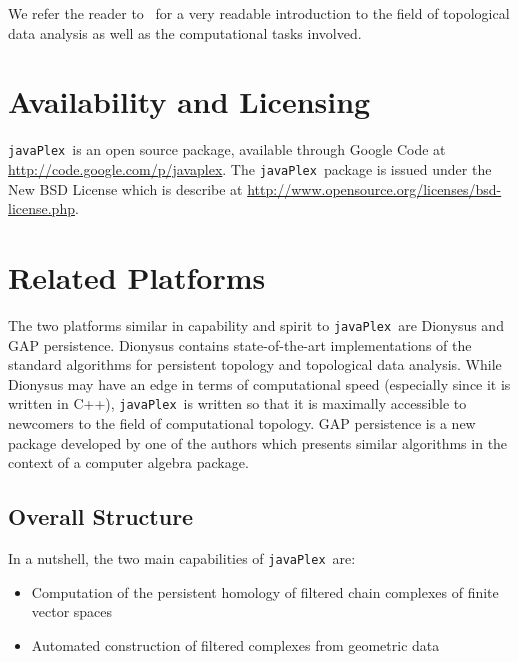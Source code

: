 \documentclass{gts2012}
\newcommand\javaPlex{\texttt{javaPlex}\ }
\begin{document}
We refer the reader to~\cite{Carlsson_09} for a very readable introduction to the field of topological data analysis as well as the computational tasks involved.

\section{Availability and Licensing}

\javaPlex is an open source package, available through Google Code at \url{http://code.google.com/p/javaplex}. The \javaPlex package is issued under the New BSD License which is describe at \url{http://www.opensource.org/licenses/bsd-license.php}. 

\section{Related Platforms}

The two platforms similar in capability and spirit to \javaPlex are Dionysus and GAP persistence. Dionysus contains state-of-the-art implementations of the standard algorithms for persistent topology and topological data analysis. While Dionysus may have an edge in terms of computational speed (especially since it is written in C++), \javaPlex is written so that it is maximally accessible to newcomers to the field of computational topology. GAP persistence is a new package developed by one of the authors which presents similar algorithms in the context of a computer algebra package.


\subsection{Overall Structure}

In a nutshell, the two main capabilities of \javaPlex are:
\begin{itemize}
\item Computation of the persistent homology of filtered chain complexes of finite vector spaces
\item Automated construction of filtered complexes from geometric data 
\end{itemize}
\end{document}
